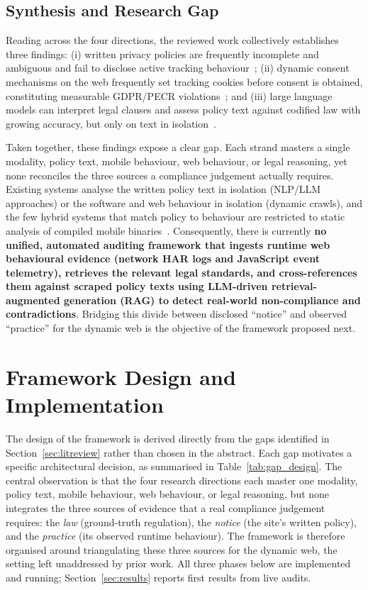 \documentclass[conference]{IEEEtran}
\begin{document}
\subsection{Synthesis and Research Gap}
\label{sec:gap}
Reading across the four directions, the reviewed work collectively establishes three findings: (i) written privacy policies are frequently incomplete and ambiguous and fail to disclose active tracking behaviour~\cite{wilson-2016-opp115,harkous-2018-polisis,ravichander-2019-privacyqa}; (ii) dynamic consent mechanisms on the web frequently set tracking cookies before consent is obtained, constituting measurable GDPR/PECR violations~\cite{trevisan-2019-cookielaw,bouhoula-2024-cookies}; and (iii) large language models can interpret legal clauses and assess policy text against codified law with growing accuracy, but only on text in isolation~\cite{guha-2023-legalbench,xie-2025-llmpolicy}.

Taken together, these findings expose a clear gap. Each strand masters a single modality, policy text, mobile behaviour, web behaviour, or legal reasoning, yet none reconciles the three sources a compliance judgement actually requires. Existing systems analyse the written policy text in isolation (NLP/LLM approaches) or the software and web behaviour in isolation (dynamic crawls), and the few hybrid systems that match policy to behaviour are restricted to static analysis of compiled mobile binaries~\cite{zimmeck-2017-mobileapps,zimmeck-2019-maps,xiao-2023-lalaine}. Consequently, there is currently \textbf{no unified, automated auditing framework that ingests runtime web behavioural evidence (network HAR logs and JavaScript event telemetry), retrieves the relevant legal standards, and cross-references them against scraped policy texts using LLM-driven retrieval-augmented generation (RAG) to detect real-world non-compliance and contradictions}. Bridging this divide between disclosed ``notice'' and observed ``practice'' for the dynamic web is the objective of the framework proposed next.

\section{Framework Design and Implementation}
\label{sec:approach}
The design of the framework is derived directly from the gaps identified in Section~\ref{sec:litreview} rather than chosen in the abstract. Each gap motivates a specific architectural decision, as summarised in Table~\ref{tab:gap_design}. The central observation is that the four research directions each master one modality, policy text, mobile behaviour, web behaviour, or legal reasoning, but none integrates the three sources of evidence that a real compliance judgement requires: the \emph{law} (ground-truth regulation), the \emph{notice} (the site's written policy), and the \emph{practice} (its observed runtime behaviour). The framework is therefore organised around triangulating these three sources for the dynamic web, the setting left unaddressed by prior work. All three phases below are implemented and running; Section~\ref{sec:results} reports first results from live audits.
\end{document}
